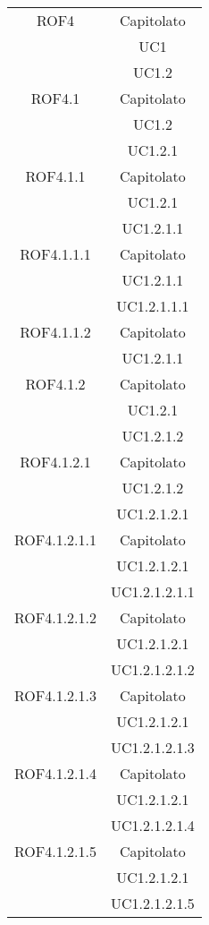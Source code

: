 \begin{longtable}{|c|c|}
\midrule
ROF4
& Capitolato\\
& UC1\\
& UC1.2\\

\midrule
ROF4.1
& Capitolato\\
& UC1.2\\
& UC1.2.1\\

\midrule
ROF4.1.1
& Capitolato\\
& UC1.2.1\\
& UC1.2.1.1\\

\midrule
ROF4.1.1.1
& Capitolato\\
& UC1.2.1.1\\
& UC1.2.1.1.1\\

\midrule
ROF4.1.1.2
& Capitolato\\
& UC1.2.1.1\\

\midrule
ROF4.1.2
& Capitolato\\
& UC1.2.1\\
& UC1.2.1.2\\

\midrule
ROF4.1.2.1
& Capitolato\\
& UC1.2.1.2\\
& UC1.2.1.2.1\\

\midrule
ROF4.1.2.1.1
& Capitolato\\
& UC1.2.1.2.1\\
& UC1.2.1.2.1.1\\

\midrule
ROF4.1.2.1.2
& Capitolato\\
& UC1.2.1.2.1\\
& UC1.2.1.2.1.2\\

\midrule
ROF4.1.2.1.3
& Capitolato\\
& UC1.2.1.2.1\\
& UC1.2.1.2.1.3\\

\midrule
ROF4.1.2.1.4
& Capitolato\\
& UC1.2.1.2.1\\
& UC1.2.1.2.1.4\\

\midrule
ROF4.1.2.1.5
& Capitolato\\
& UC1.2.1.2.1\\
& UC1.2.1.2.1.5\\


\end{longtable}
